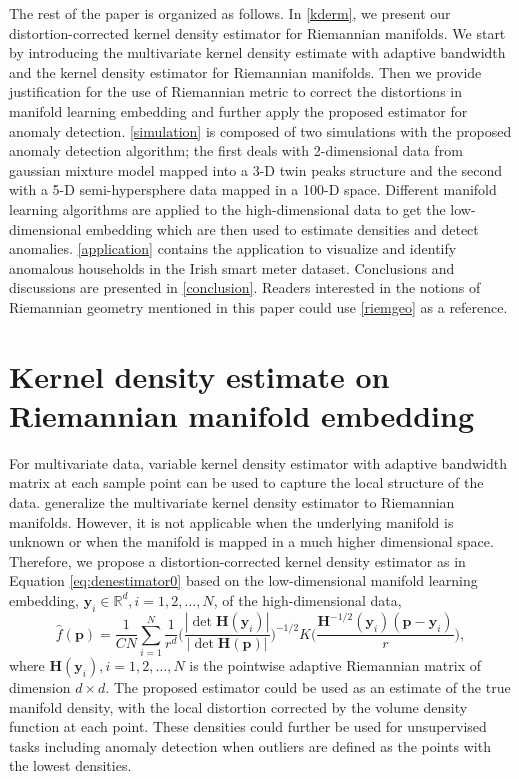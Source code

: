\documentclass[11pt,a4paper,]{article}
\begin{document}
The rest of the paper is organized as follows. In \autoref{kderm}, we present our distortion-corrected kernel density estimator for Riemannian manifolds. We start by introducing the multivariate kernel density estimate with adaptive bandwidth and the kernel density estimator for Riemannian manifolds. Then we provide justification for the use of Riemannian metric to correct the distortions in manifold learning embedding and further apply the proposed estimator for anomaly detection. \autoref{simulation} is composed of two simulations with the proposed anomaly detection algorithm; the first deals with 2-dimensional data from gaussian mixture model mapped into a 3-D twin peaks structure and the second with a 5-D semi-hypersphere data mapped in a 100-D space. Different manifold learning algorithms are applied to the high-dimensional data to get the low-dimensional embedding which are then used to estimate densities and detect anomalies.
\autoref{application} contains the application to visualize and identify anomalous households in the Irish smart meter dataset. Conclusions and discussions are presented in \autoref{conclusion}. Readers interested in the notions of Riemannian geometry mentioned in this paper could use \autoref{riemgeo} as a reference.

\hypertarget{kderm}{%
\section{Kernel density estimate on Riemannian manifold embedding}\label{kderm}}

For multivariate data, variable kernel density estimator with adaptive bandwidth matrix at each sample point can be used to capture the local structure of the data. \textcite{Pelletier2005-vu} generalize the multivariate kernel density estimator to Riemannian manifolds. However, it is not applicable when the underlying manifold is unknown or when the manifold is mapped in a much higher dimensional space. Therefore, we propose a distortion-corrected kernel density estimator as in Equation \eqref{eq:denestimator0} based on the low-dimensional manifold learning embedding, \(\pmb{y}_i \in \mathbb{R}^d, i = 1, 2, \dots, N\), of the high-dimensional data,
\begin{equation}
\label{eq:denestimator0}
\hat{f}(\pmb{p}) = \frac{1}{CN} \sum_{i=1}^{N} \frac{1}{r^d} \bigg(\frac{|\det \pmb{H}(\pmb{y}_i)|}{|\det \pmb{H}(\pmb{p})|} \bigg)^{-1/2} K\bigg( \frac{ \pmb{H}^{-1/2}(\pmb{y}_i) (\pmb{p} - \pmb{y}_i)}{r} \bigg),
\end{equation}
where \(\pmb{H}(\pmb{y}_i), i = 1, 2, \dots, N\) is the pointwise adaptive Riemannian matrix of dimension \(d \times d\).
The proposed estimator could be used as an estimate of the true manifold density, with the local distortion corrected by the volume density function at each point. These densities could further be used for unsupervised tasks including anomaly detection when outliers are defined as the points with the lowest densities.
\end{document}
